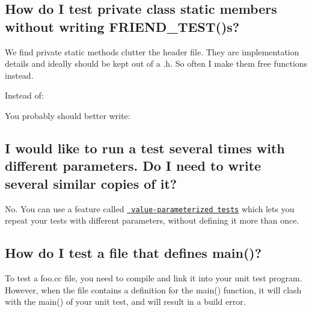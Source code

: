 \subsection*{How do I test private class static members without writing F\+R\+I\+E\+N\+D\+\_\+\+T\+E\+S\+T()s?}

We find private static methods clutter the header file. They are implementation details and ideally should be kept out of a .h. So often I make them free functions instead.

Instead of\+: 
\begin{DoxyCode}{0}
\DoxyCodeLine{\};}
\DoxyCodeLine{}
\DoxyCodeLine{}
\end{DoxyCode}


You probably should better write\+: 
\begin{DoxyCode}{0}
\DoxyCodeLine{\};}
\DoxyCodeLine{}
\DoxyCodeLine{\}}
\DoxyCodeLine{}
\DoxyCodeLine{\}}
\DoxyCodeLine{}
\end{DoxyCode}


\subsection*{I would like to run a test several times with different parameters. Do I need to write several similar copies of it?}

No. You can use a feature called \href{V1_5_AdvancedGuide.md#Value_Parameterized_Tests}\texttt{ value-\/parameterized tests} which lets you repeat your tests with different parameters, without defining it more than once.

\subsection*{How do I test a file that defines main()?}

To test a {\ttfamily foo.\+cc} file, you need to compile and link it into your unit test program. However, when the file contains a definition for the {\ttfamily main()} function, it will clash with the {\ttfamily main()} of your unit test, and will result in a build error.

